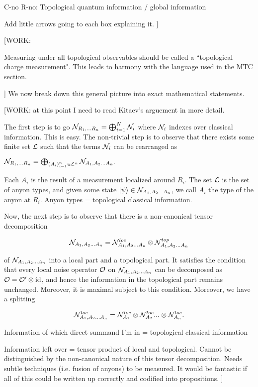 C-no R-no: Topological quantum information / global information 

Add little arrows going to each box explaining it.
]


[WORK:

Measuring under all topological observables should be called a ``topological charge measurement". This leads to harmony with the language used in the MTC section.

]
We now break down this general picture into exact mathematical statements.

[WORK: at this point I need to read Kitaev's arguement in more detail.

The first step is to go $\mathcal{N}_{R_1,... R_n}=\bigoplus_{i=1}^{N}\mathcal{N}_{i}$ where $\mathcal{N}_i$ indexes over classical information. This is easy. The non-trivial step is to observe that there exists some finite set $\mathcal{L}$ such that the terms $\mathcal{N}_i$ can be rearranged as 

$\mathcal{N}_{R_1,... R_n}=\bigoplus_{(A_i)_{i=1}^n\in \mathcal{L}^n}\mathcal{N}_{A_1,A_2... A_n}.$

Each $A_i$ is the result of a measurement localized around $R_i$. The set $\mathcal{L}$ is the set of anyon types, and given some state $\ket{\psi}\in \mathcal{N}_{A_1,A_2... A_n}$, we call $A_i$ the type of the anyon at $R_i$. Anyon types = topological classical information.

Now, the next step is to observe that there is a non-canonical tensor decomposition


$$
\mathcal{N}_{A_1,A_2... A_n}=\mathcal{N}^{loc}_{A_1,A_2... A_n}\otimes \mathcal{N}^{top}_{A_1,A_2... A_n}
$$

of $\mathcal{N}_{A_1,A_2... A_n}$ into a local part and a topological part. It satisfies the condition that every local noise operator $\mathcal{O}$ on $\mathcal{N}_{A_1,A_2... A_n}$ can be decomposed as $\mathcal{O}=\mathcal{O}'\otimes \operatorname{id}$, and hence the information in the topological part remains unchanged. Moreover, it is maximal subject to this condition. Moreover, we have a splitting

$$\mathcal{N}^{loc}_{A_1,A_2... A_n}=\mathcal{N}^{loc}_{A_1}\otimes \mathcal{N}^{loc}_{A_2}...\otimes \mathcal{N}^{loc}_{A_n}.$$


Information of which direct summand I'm in = topological classical information

Information left over = tensor product of local and topological. Cannot be distinguished by the non-canonical nature of this tensor decomposition. Needs subtle techniques (i.e. fusion of anyons) to be measured. It would be fantastic if all of this could be written up correctly and codified into propositions.
]



